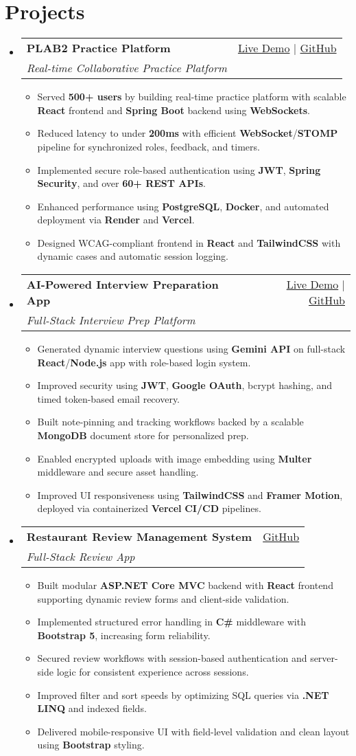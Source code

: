 \documentclass[letterpaper,11pt]{article}
\makeatletter
\newcommand{\resumeItem}[1]{\item\small{#1 \vspace{-2pt}}}
\newcommand{\resumeSubheading}[4]{
  \vspace{-1pt}\item
    \begin{tabular*}{0.97\textwidth}[t]{l@{\extracolsep{\fill}}r}
      \textbf{#1} & #2 \\
      \textit{\small#3} & \textit{\small #4} \\
    \end{tabular*}\vspace{-5pt}
}
\newcommand{\resumeSubHeadingListStart}{\begin{itemize}[leftmargin=*]}
\newcommand{\resumeSubHeadingListEnd}{\end{itemize}}
\newcommand{\resumeItemListStart}{\begin{itemize}}
\newcommand{\resumeItemListEnd}{\end{itemize}\vspace{-5pt}}
\makeatother
\begin{document}
\section{Projects}
  \resumeSubHeadingListStart
    \resumeSubheading
      {\textbf{PLAB2 Practice Platform}}{\href{https://plab2practice.com}{Live Demo} | \href{https://github.com/altansaid/plab2projectnew}{GitHub}}
      {Real-time Collaborative Practice Platform}{}
      \resumeItemListStart
        \resumeItem{Served \textbf{500+ users} by building real-time practice platform with scalable \textbf{React} frontend and \textbf{Spring Boot} backend using \textbf{WebSockets}.}
        \resumeItem{Reduced latency to under \textbf{200ms} with efficient \textbf{WebSocket}/\textbf{STOMP} pipeline for synchronized roles, feedback, and timers.}
        \resumeItem{Implemented secure role-based authentication using \textbf{JWT}, \textbf{Spring Security}, and over \textbf{60+ REST APIs}.}
        \resumeItem{Enhanced performance using \textbf{PostgreSQL}, \textbf{Docker}, and automated deployment via \textbf{Render} and \textbf{Vercel}.}
        \resumeItem{Designed WCAG-compliant frontend in \textbf{React} and \textbf{TailwindCSS} with dynamic cases and automatic session logging.}
      \resumeItemListEnd

    \resumeSubheading
      {\textbf{AI-Powered Interview Preparation App}}{\href{https://interviewcoach-ai.vercel.app}{Live Demo} | \href{https://github.com/altansaid/interviewcoach-ai}{GitHub}}
      {Full-Stack Interview Prep Platform}{}
      \resumeItemListStart
        \resumeItem{Generated dynamic interview questions using \textbf{Gemini API} on full-stack \textbf{React}/\textbf{Node.js} app with role-based login system.}
        \resumeItem{Improved security using \textbf{JWT}, \textbf{Google OAuth}, bcrypt hashing, and timed token-based email recovery.}
        \resumeItem{Built note-pinning and tracking workflows backed by a scalable \textbf{MongoDB} document store for personalized prep.}
        \resumeItem{Enabled encrypted uploads with image embedding using \textbf{Multer} middleware and secure asset handling.}
        \resumeItem{Improved UI responsiveness using \textbf{TailwindCSS} and \textbf{Framer Motion}, deployed via containerized \textbf{Vercel} \textbf{CI/CD} pipelines.}
      \resumeItemListEnd

    \resumeSubheading
      {\textbf{Restaurant Review Management System}}{\href{https://github.com/altansaid/restaurantreviewmanagementsystem}{GitHub}}{Full-Stack Review App}{}
      \resumeItemListStart
        \resumeItem{Built modular \textbf{ASP.NET Core MVC} backend with \textbf{React} frontend supporting dynamic review forms and client-side validation.}
        \resumeItem{Implemented structured error handling in \textbf{C\#} middleware with \textbf{Bootstrap 5}, increasing form reliability.}
        \resumeItem{Secured review workflows with session-based authentication and server-side logic for consistent experience across sessions.}
        \resumeItem{Improved filter and sort speeds by optimizing SQL queries via \textbf{.NET LINQ} and indexed fields.}
        \resumeItem{Delivered mobile-responsive UI with field-level validation and clean layout using \textbf{Bootstrap} styling.}
      \resumeItemListEnd
  \resumeSubHeadingListEnd
\end{document}
